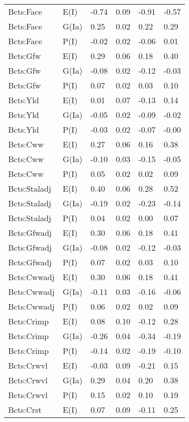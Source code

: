 \begin{center}
\begin{longtable}{|p{1.1in}|p{0.7in}|p{0.7in}|p{0.6in}|p{0.6in}|p{0.6in}|}
  Bcts:Face & E(I) & -0.74 & 0.09 & -0.91 & -0.57 \\ 
  Bcts:Face & G(Ia) & 0.25 & 0.02 & 0.22 & 0.29 \\ 
  Bcts:Face & P(I) & -0.02 & 0.02 & -0.06 & 0.01 \\ 
  Bcts:Gfw & E(I) & 0.29 & 0.06 & 0.18 & 0.40 \\ 
  Bcts:Gfw & G(Ia) & -0.08 & 0.02 & -0.12 & -0.03 \\ 
  Bcts:Gfw & P(I) & 0.07 & 0.02 & 0.03 & 0.10 \\ 
  Bcts:Yld & E(I) & 0.01 & 0.07 & -0.13 & 0.14 \\ 
  Bcts:Yld & G(Ia) & -0.05 & 0.02 & -0.09 & -0.02 \\ 
  Bcts:Yld & P(I) & -0.03 & 0.02 & -0.07 & -0.00 \\ 
  Bcts:Cww & E(I) & 0.27 & 0.06 & 0.16 & 0.38 \\ 
  Bcts:Cww & G(Ia) & -0.10 & 0.03 & -0.15 & -0.05 \\ 
  Bcts:Cww & P(I) & 0.05 & 0.02 & 0.02 & 0.09 \\ 
  Bcts:Staladj & E(I) & 0.40 & 0.06 & 0.28 & 0.52 \\ 
  Bcts:Staladj & G(Ia) & -0.19 & 0.02 & -0.23 & -0.14 \\ 
  Bcts:Staladj & P(I) & 0.04 & 0.02 & 0.00 & 0.07 \\ 
  Bcts:Gfwadj & E(I) & 0.30 & 0.06 & 0.18 & 0.41 \\ 
  Bcts:Gfwadj & G(Ia) & -0.08 & 0.02 & -0.12 & -0.03 \\ 
  Bcts:Gfwadj & P(I) & 0.07 & 0.02 & 0.03 & 0.10 \\ 
  Bcts:Cwwadj & E(I) & 0.30 & 0.06 & 0.18 & 0.41 \\ 
  Bcts:Cwwadj & G(Ia) & -0.11 & 0.03 & -0.16 & -0.06 \\ 
  Bcts:Cwwadj & P(I) & 0.06 & 0.02 & 0.02 & 0.09 \\ 
  Bcts:Crimp & E(I) & 0.08 & 0.10 & -0.12 & 0.28 \\ 
  Bcts:Crimp & G(Ia) & -0.26 & 0.04 & -0.34 & -0.19 \\ 
  Bcts:Crimp & P(I) & -0.14 & 0.02 & -0.19 & -0.10 \\ 
  Bcts:Crwvl & E(I) & -0.03 & 0.09 & -0.21 & 0.15 \\ 
  Bcts:Crwvl & G(Ia) & 0.29 & 0.04 & 0.20 & 0.38 \\ 
  Bcts:Crwvl & P(I) & 0.15 & 0.02 & 0.10 & 0.19 \\ 
  Bcts:Crst & E(I) & 0.07 & 0.09 & -0.11 & 0.25 \\ 

\end{longtable}
\end{center}
